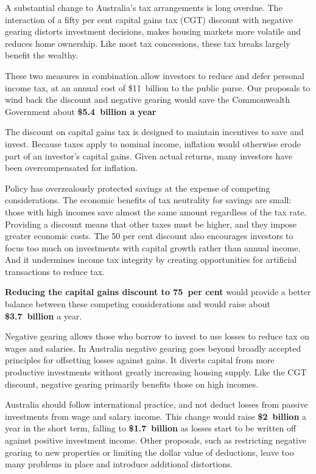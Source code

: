 



\setlength{\overviewextra}{-2pt}
\addtolength{\columnsep}{\overviewextra}
\begin{overview}[-4\baselineskip] %
A substantial change to Australia's tax arrangements is long overdue. The interaction of a fifty per cent capital gains tax (CGT) discount with negative gearing distorts investment decisions, makes housing markets more volatile and reduces home ownership. Like most tax concessions, these tax breaks largely benefit the wealthy.

These two measures in combination allow investors to reduce and defer personal income tax, at an annual cost of \$11~billion to the public purse. Our proposals to wind back the discount and negative gearing would save the Commonwealth Government about \textbf{\$5.4~billion a year}

The discount on capital gains tax is designed to maintain incentives to save and invest.  Because taxes apply to nominal income, inflation would otherwise erode part of an investor's capital gains. Given actual returns, many investors have been overcompensated for inflation. 

Policy has overzealously protected savings at the expense of competing considerations. The economic benefits of tax neutrality for savings are small: those with high incomes save almost the same amount regardless of the tax rate. Providing a discount means that other taxes must be higher, and they impose greater economic costs. The 50 per cent discount also encourages investors to focus too much on investments with capital growth rather than annual income. And it undermines income tax integrity by creating opportunities for artificial transactions to reduce tax.

\textbf{Reducing the capital gains discount to 75~per cent} would provide a better balance between these competing considerations and would raise about \textbf{\$3.7~billion} a year.

Negative gearing allows those who borrow to invest to use losses to reduce tax on wages and salaries. In Australia negative gearing goes beyond broadly accepted principles for offsetting losses against gains. It diverts capital from more productive investments without greatly increasing housing supply. Like the CGT discount, negative gearing primarily benefits those on high incomes.

Australia should follow international practice, and not deduct losses from passive investments from wage and salary income.  This change would raise \textbf{\$2~billion} a year in the short term, falling to \textbf{\$1.7~billion} as losses start to be written off against positive investment income. Other proposals, such as restricting negative gearing to new properties or limiting the dollar value of deductions, leave too many problems in place and introduce additional distortions. 


\end{overview}
